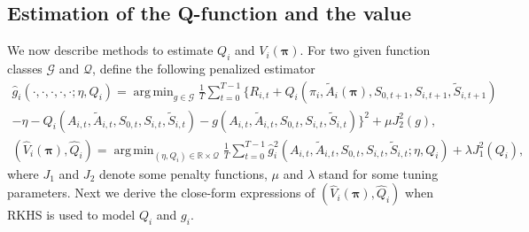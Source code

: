 \documentclass{article}
\DeclareMathOperator*{\argmin}{arg\,min}
\begin{document}
\subsection{Estimation of the Q-function and the value}\label{sec:Q}
We now describe methods to estimate $Q_i$ and $V_i(\bm{\pi})$. For two given function classes $\mathcal{G}$ and $\mathcal{Q}$, define the following penalized estimator
\begin{eqnarray*}
	\widehat{g}_{i}(\cdot,\cdot,\cdot,\cdot,\cdot;\eta,Q_i)=\argmin_{g\in \mathcal{G}}\frac{1}{T}\sum_{t=0}^{T-1} \{R_{i,t}+Q_{i}(\pi_i,\widetilde{A}_i(\bm{\pi}),S_{0,t+1},S_{i,t+1},\widetilde{S}_{i,t+1})\\
	-\eta-Q_i(A_{i,t},\widetilde{A}_{i,t},S_{0,t},S_{i,t},\widetilde{S}_{i,t})-g(A_{i,t},\widetilde{A}_{i,t},S_{0,t},S_{i,t},\widetilde{S}_{i,t})\}^2+\mu J_2^2(g),\\
	(\widehat{V}_i(\bm{\pi}),\widehat{Q}_i)=\argmin_{(\eta,Q_i)\in \mathbb{R}\times \mathcal{Q}}\frac{1}{T}\sum_{t=0}^{T-1} \widehat{g}_{i}^2(A_{i,t},\widetilde{A}_{i,t},S_{0,t},S_{i,t},\widetilde{S}_{i,t};\eta,Q_i)+\lambda J_1^2(Q_i),
\end{eqnarray*}
where $J_1$ and $J_2$ denote some penalty functions, $\mu$ and $\lambda$ stand for some tuning parameters. Next we derive the close-form expressions of 	$(\widehat{V}_i(\bm{\pi}),\widehat{Q}_i)$ when RKHS is used to model $Q_i$ and $g_i$. %
\end{document}
